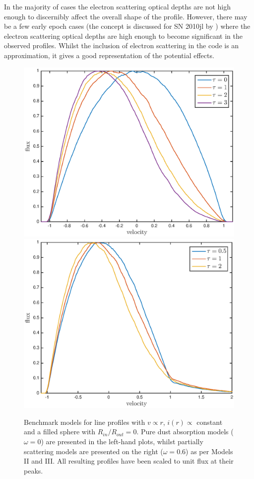 \documentclass[useAMS,usenatbib,usegraphicx]{mnras}
\begin{document}
In the majority of cases the electron scattering optical depths are not high 
enough to discernibly affect the overall shape of the profile.  However, 
there may be a few early epoch cases (the concept is discussed for SN 2010jl 
by \citet{Fransson2013}) where the electron scattering optical depths are high enough to 
become significant in the observed profiles.  Whilst the inclusion of 
electron scattering in the code is an approximation, it gives a good 
representation of the potential effects.


\begin{figure}
\includegraphics[trim =33 10 45 15,clip=true,scale=0.51]{params/opt_thick_w0} 
\includegraphics[trim =33 10 45 15,clip=true,scale=0.51]{params/opt_thick_w0_6}  
\caption{Benchmark models for line profiles  with $v \propto r$, $i(r) \propto$ constant and a filled sphere with $R_{in}/R_{out}=0$.  Pure dust absorption models ($\omega = 0$) are presented in the left-hand plots, whilst partially scattering models are presented on the right ($\omega = 0.6$) as per \citet{Lucy1989} Models II and III. All resulting profiles have been scaled to unit flux at their peaks.}
\label{fig:Lucy}
\end{figure}
\end{document}
